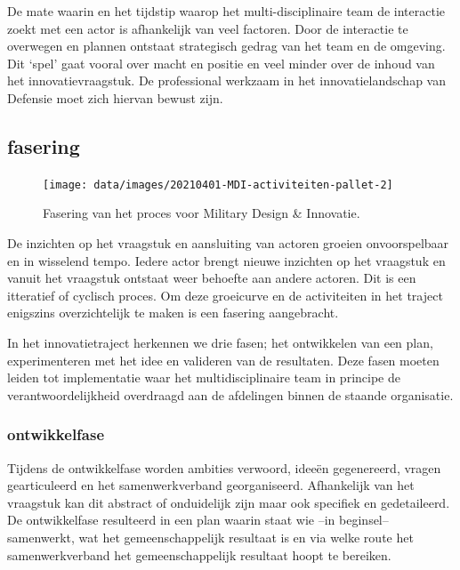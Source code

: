 \documentclass[
]{book}
\begin{document}
De mate waarin en het tijdstip waarop het multi-disciplinaire team de interactie zoekt met een actor is afhankelijk van veel factoren. Door de interactie te overwegen en plannen ontstaat strategisch gedrag van het team en de omgeving. Dit `spel' gaat vooral over macht en positie en veel minder over de inhoud van het innovatievraagstuk. De professional werkzaam in het innovatielandschap van Defensie moet zich hiervan bewust zijn.

\hypertarget{fasering}{%
\subsection{fasering}\label{fasering}}

\begin{figure}

{\centering \texttt{[image: data/images/20210401-MDI-activiteiten-pallet-2]} 

}

\caption{Fasering van het proces voor Military Design \& Innovatie.}\label{fig:unnamed-chunk-11}
\end{figure}

De inzichten op het vraagstuk en aansluiting van actoren groeien onvoorspelbaar en in wisselend tempo. Iedere actor brengt nieuwe inzichten op het vraagstuk en vanuit het vraagstuk ontstaat weer behoefte aan andere actoren. Dit is een itteratief of cyclisch proces. Om deze groeicurve en de activiteiten in het traject enigszins overzichtelijk te maken is een fasering aangebracht.

In het innovatietraject herkennen we drie fasen; het ontwikkelen van een plan, experimenteren met het idee en valideren van de resultaten. Deze fasen moeten leiden tot implementatie waar het multidisciplinaire team in principe de verantwoordelijkheid overdraagd aan de afdelingen binnen de staande organisatie.

\hypertarget{ontwikkelfase}{%
\subsubsection{ontwikkelfase}\label{ontwikkelfase}}

Tijdens de ontwikkelfase worden ambities verwoord, ideeën gegenereerd, vragen gearticuleerd en het samenwerkverband georganiseerd. Afhankelijk van het vraagstuk kan dit abstract of onduidelijk zijn maar ook specifiek en gedetaileerd. De ontwikkelfase resulteerd in een plan waarin staat wie --in beginsel-- samenwerkt, wat het gemeenschappelijk resultaat is en via welke route het samenwerkverband het gemeenschappelijk resultaat hoopt te bereiken.
\end{document}

